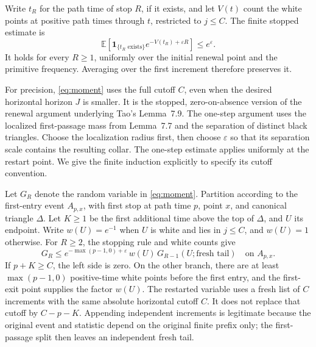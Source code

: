 \documentclass[11pt,a4paper]{article}
\newcommand{\E}{\mathbb E}
\newcommand{\eps}{\varepsilon}
\begin{document}
Write \(t_R\) for the path time of stop \(R\), if it exists, and
let \(V(t)\) count the white points at positive path times through
\(t\), restricted to \(j\le C\). The finite stopped estimate is
\begin{equation}\label{eq:moment}
 \E\left[\mathbf1_{\{t_R\text{ exists}\}}
                e^{-V(t_R)+\eps R}\right]\le e^\eps.
\end{equation}
It holds for every \(R\ge1\), uniformly over the initial renewal
point and the primitive frequency. Averaging over the first increment
therefore preserves it.

For precision, \eqref{eq:moment} uses the full cutoff \(C\), even
when the desired horizontal horizon \(J\) is smaller. It is the
stopped, zero-on-absence version of the renewal argument underlying
Tao's Lemma~7.9. The one-step argument uses the localized
first-passage mass from Lemma~7.7 and the separation of distinct black
triangles. Choose the localization radius first, then choose \(\eps\)
so that its separation scale contains the resulting collar. The
one-step estimate applies uniformly at the restart point. We give the
finite induction explicitly to specify its cutoff convention.

Let \(G_R\) denote the random variable in \eqref{eq:moment}. Partition
according to the first-entry event \(A_{p,x}\), with first stop at
path time \(p\), point \(x\), and canonical triangle \(\Delta\).
Let \(K\ge1\) be the first additional time above the top of
\(\Delta\), and \(U\) its endpoint. Write \(w(U)=e^{-1}\) when
\(U\) is white and lies in \(j\le C\), and \(w(U)=1\) otherwise.
For \(R\ge2\), the stopping rule and white counts give
\begin{equation}\label{eq:one-step}
 G_R\le e^{-\max(p-1,0)+\eps}\,w(U)\,
              G_{R-1}(U;\text{fresh tail})
 \quad\text{on }A_{p,x}.
\end{equation}
If \(p+K\ge C\), the left side is zero. On the other branch, there
are at least \(\max(p-1,0)\) positive-time white points before the
first entry, and the first-exit point supplies the factor \(w(U)\).
The restarted variable uses a fresh list of \(C\) increments with
the same absolute horizontal cutoff \(C\). It does not replace that
cutoff by \(C-p-K\). Appending independent increments is legitimate
because the original event and statistic depend on the original
finite prefix only; the first-passage split then leaves an independent
fresh tail.
\end{document}
